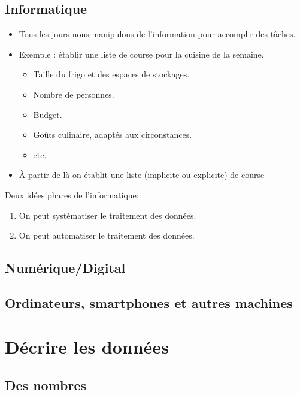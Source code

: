 \documentclass{beamer}
\begin{document}
\subsection{Informatique}

\begin{frame}
	\begin{itemize}
	\item Tous les jours nous manipulons de l'information pour accomplir des tâches.
	\item Exemple : établir une liste de course pour la cuisine de la semaine.
		
		\begin{itemize}
			\item Taille du frigo et des espaces de stockages.
			\item Nombre de personnes.
			\item Budget.
			\item Goûts culinaire, adaptés aux circonstances.
			\item etc.
		\end{itemize}
	\item À partir de là on établit une liste (implicite ou explicite) de course
	
	\end{itemize}
\end{frame}

\begin{frame}

Deux idées phares de l'informatique:
	\begin{enumerate}
		\item On peut systématiser le traitement des données.
		\item On peut automatiser le traitement des données.
	\end{enumerate}
\end{frame}
\subsection{Numérique/Digital}
\subsection{Ordinateurs, smartphones et autres machines}

\section{Décrire les données}
\subsection{Des nombres}
\end{document}

